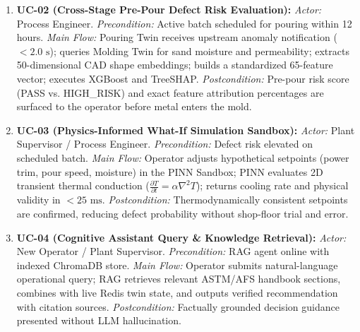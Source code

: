 \documentclass[11pt, a4paper]{article}
\begin{document}
\begin{itemize}[noitemsep, topsep=2pt]
\begin{enumerate}[noitemsep, topsep=2pt]
        \item \textbf{UC-02 (Cross-Stage Pre-Pour Defect Risk Evaluation):} \textit{Actor:} Process Engineer. \textit{Precondition:} Active batch scheduled for pouring within 12 hours. \textit{Main Flow:} Pouring Twin receives upstream anomaly notification ($<2.0\text{ s}$); queries Molding Twin for sand moisture and permeability; extracts 50-dimensional CAD shape embeddings; builds a standardized 65-feature vector; executes XGBoost and TreeSHAP. \textit{Postcondition:} Pre-pour risk score (PASS vs. HIGH\_RISK) and exact feature attribution percentages are surfaced to the operator before metal enters the mold.
        \item \textbf{UC-03 (Physics-Informed What-If Simulation Sandbox):} \textit{Actor:} Plant Supervisor / Process Engineer. \textit{Precondition:} Defect risk elevated on scheduled batch. \textit{Main Flow:} Operator adjusts hypothetical setpoints (power trim, pour speed, moisture) in the PINN Sandbox; PINN evaluates 2D transient thermal conduction ($\frac{\partial T}{\partial t} = \alpha \nabla^2 T$); returns cooling rate and physical validity in $<25\text{ ms}$. \textit{Postcondition:} Thermodynamically consistent setpoints are confirmed, reducing defect probability without shop-floor trial and error.
        \item \textbf{UC-04 (Cognitive Assistant Query \& Knowledge Retrieval):} \textit{Actor:} New Operator / Plant Supervisor. \textit{Precondition:} RAG agent online with indexed ChromaDB store. \textit{Main Flow:} Operator submits natural-language operational query; RAG retrieves relevant ASTM/AFS handbook sections, combines with live Redis twin state, and outputs verified recommendation with citation sources. \textit{Postcondition:} Factually grounded decision guidance presented without LLM hallucination.
    \end{enumerate}
\end{itemize}
\end{document}
